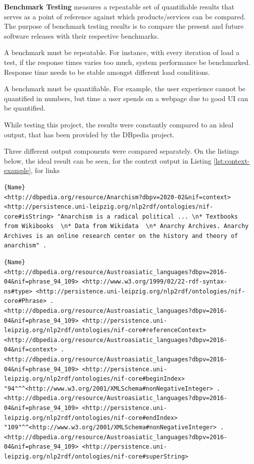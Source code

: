 \documentclass[thesis=M,english,hidelinks]{FITthesis}[2019/12/23]
\begin{document}
\textbf{Benchmark Testing} measures a repeatable set of quantifiable results that serves as a point of reference against which products/services can be compared. The purpose of benchmark testing results is to compare the present and future software releases with their respective benchmarks.

A benchmark must be repeatable. For instance, with every iteration of load a test, if the response times varies too much, system performance be benchmarked. Response time needs to be stable amongst different load conditions.

A benchmark must be quantifiable. For example, the user experience cannot be quantified in numbers, but time a user spends on a webpage due to good UI can be quantified.

While testing this project, the results were constantly compared to an ideal output, that has been provided by the DBpedia project\cite{dbpedia_url}.

Three different output components were compared separately. On the listings below, the ideal result can be seen, for the context output in Listing \ref{lst:context-example}, for links 

\begin{lstlisting}[caption=Exemplary result for NIF Context,frame=tlrb,  label = {lst:context-example}]{Name}
<http://dbpedia.org/resource/Anarchism?dbpv=2020-02&nif=context> <http://persistence.uni-leipzig.org/nlp2rdf/ontologies/nif-core#isString> "Anarchism is a radical political ... \n* Textbooks from Wikibooks  \n* Data from Wikidata  \n* Anarchy Archives. Anarchy Archives is an online research center on the history and theory of anarchism" .
\end{lstlisting}

\begin{lstlisting}[caption=Exemplary result for NIF Links,frame=tlrb,  label = {lst:links-example}]{Name}
<http://dbpedia.org/resource/Austroasiatic_languages?dbpv=2016-04&nif=phrase_94_109> <http://www.w3.org/1999/02/22-rdf-syntax-ns#type> <http://persistence.uni-leipzig.org/nlp2rdf/ontologies/nif-core#Phrase> .
<http://dbpedia.org/resource/Austroasiatic_languages?dbpv=2016-04&nif=phrase_94_109> <http://persistence.uni-leipzig.org/nlp2rdf/ontologies/nif-core#referenceContext> <http://dbpedia.org/resource/Austroasiatic_languages?dbpv=2016-04&nif=context> .
<http://dbpedia.org/resource/Austroasiatic_languages?dbpv=2016-04&nif=phrase_94_109> <http://persistence.uni-leipzig.org/nlp2rdf/ontologies/nif-core#beginIndex> "94"^^<http://www.w3.org/2001/XMLSchema#nonNegativeInteger> .
<http://dbpedia.org/resource/Austroasiatic_languages?dbpv=2016-04&nif=phrase_94_109> <http://persistence.uni-leipzig.org/nlp2rdf/ontologies/nif-core#endIndex> "109"^^<http://www.w3.org/2001/XMLSchema#nonNegativeInteger> .
<http://dbpedia.org/resource/Austroasiatic_languages?dbpv=2016-04&nif=phrase_94_109> <http://persistence.uni-leipzig.org/nlp2rdf/ontologies/nif-core#superString>
\end{lstlisting}
\end{document}
